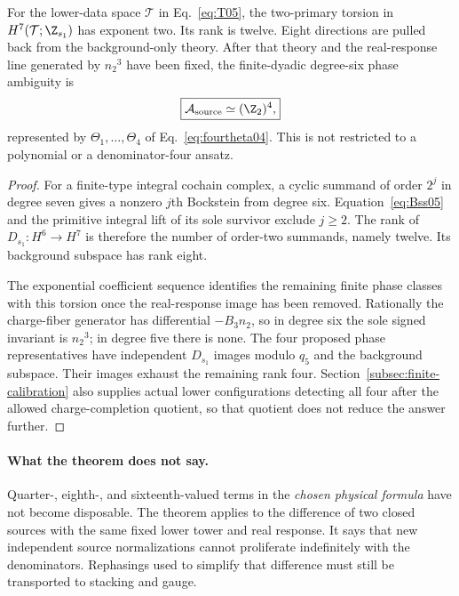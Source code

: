 \begin{theorem}\label{thm:dyadicbound05}
For the lower-data space $\mathcal T$ in Eq.~\eqref{eq:T05}, the two-primary torsion in $H^7(\mathcal T;\Z_{s_1})$ has exponent two. Its rank is twelve. Eight directions are pulled back from the background-only theory. After that theory and the real-response line generated by ${n_2}^3$ have been fixed, the finite-dyadic degree-six phase ambiguity is
\begin{equation}\label{eq:allsource05}
 \boxed{\mathcal A_{\mathrm{source}}\simeq(\Z_2)^4,}
\end{equation}
represented by $\Theta_1,\ldots,\Theta_4$ of Eq.~\eqref{eq:fourtheta04}. This is not restricted to a polynomial or a denominator-four ansatz.
\end{theorem}
\begin{proof}
For a finite-type integral cochain complex, a cyclic summand of order $2^j$ in degree seven gives a nonzero $j$th Bockstein from degree six. Equation~\eqref{eq:Bss05} and the primitive integral lift of its sole survivor exclude $j\geq2$. The rank of $D_{s_1}:H^6\to H^7$ is therefore the number of order-two summands, namely twelve. Its background subspace has rank eight.

The exponential coefficient sequence identifies the remaining finite phase classes with this torsion once the real-response image has been removed. Rationally the charge-fiber generator has differential $-{B_3}{n_2}$, so in degree six the sole signed invariant is ${n_2}^3$; in degree five there is none. The four proposed phase representatives have independent $D_{s_1}$ images modulo $q_5$ and the background subspace. Their images exhaust the remaining rank four. Section~\ref{subsec:finite-calibration} also supplies actual lower configurations detecting all four after the allowed charge-completion quotient, so that quotient does not reduce the answer further.
\end{proof}

\paragraph{What the theorem does not say.}
Quarter-, eighth-, and sixteenth-valued terms in the \emph{chosen physical formula} have not become disposable. The theorem applies to the difference of two closed sources with the same fixed lower tower and real response. It says that new independent source normalizations cannot proliferate indefinitely with the denominators. Rephasings used to simplify that difference must still be transported to stacking and gauge.


